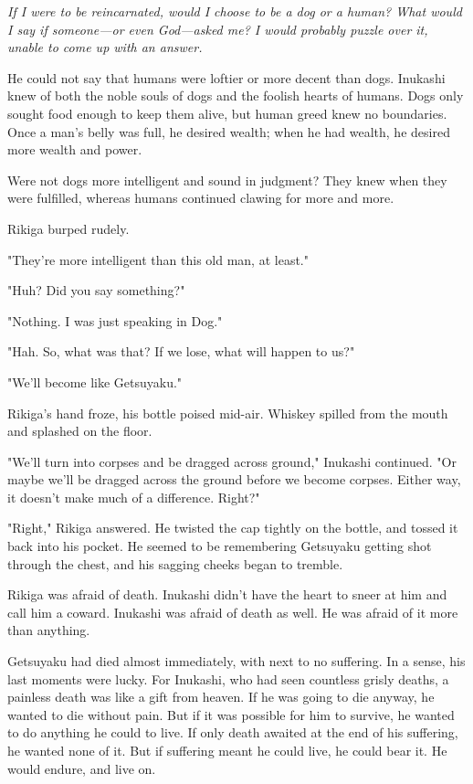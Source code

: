 \emph{If I were to be reincarnated, would I choose to be a dog or a human?
What would I say if someone---or even God---asked me? I would probably
puzzle over it, unable to come up with an answer.}

He could not say that humans were loftier or more decent than dogs.
Inukashi knew of both the noble souls of dogs and the foolish hearts of
humans. Dogs only sought food enough to keep them alive, but human greed
knew no boundaries. Once a man's belly was full, he desired wealth; when
he had wealth, he desired more wealth and power.

Were not dogs more intelligent and sound in judgment? They knew when
they were fulfilled, whereas humans continued clawing for more and more.

Rikiga burped rudely.

"They're more intelligent than this old man, at least."

"Huh? Did you say something?"

"Nothing. I was just speaking in Dog."

"Hah. So, what was that? If we lose, what will happen to us?"

"We'll become like Getsuyaku."

Rikiga's hand froze, his bottle poised mid-air. Whiskey spilled from the
mouth and splashed on the floor.

"We'll turn into corpses and be dragged across ground," Inukashi
continued. "Or maybe we'll be dragged across the ground before we become
corpses. Either way, it doesn't make much of a difference. Right?"

"Right," Rikiga answered. He twisted the cap tightly on the bottle, and
tossed it back into his pocket. He seemed to be remembering Getsuyaku
getting shot through the chest, and his sagging cheeks began to tremble.

Rikiga was afraid of death. Inukashi didn't have the heart to sneer at
him and call him a coward. Inukashi was afraid of death as well. He was
afraid of it more than anything.

Getsuyaku had died almost immediately, with next to no suffering. In a
sense, his last moments were lucky. For Inukashi, who had seen countless
grisly deaths, a painless death was like a gift from heaven. If he was
going to die anyway, he wanted to die without pain. But if it was
possible for him to survive, he wanted to do anything he could to live.
If only death awaited at the end of his suffering, he wanted none of it.
But if suffering meant he could live, he could bear it. He would endure,
and live on.

